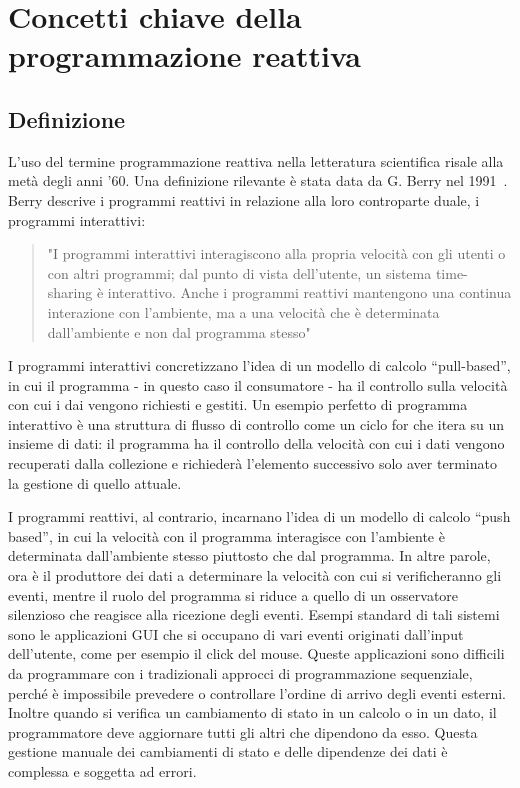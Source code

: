 \documentclass[12pt,a4paper,openright,twoside]{book}
\begin{document}
\section{Concetti chiave della programmazione reattiva}
\subsection{Definizione}
L'uso del termine programmazione reattiva nella letteratura scientifica risale alla metà degli anni '60. Una definizione rilevante è stata data da G. Berry nel 1991~\cite{DBLP:journals/pieee/BenvenisteB91}. Berry descrive i programmi reattivi in relazione alla loro controparte duale, i programmi interattivi: 
\begin{quotation}
    "I programmi interattivi interagiscono alla propria velocità con gli utenti o con altri programmi; dal punto di vista dell'utente, un sistema time-sharing è interattivo. Anche i programmi reattivi mantengono una continua interazione con l'ambiente, ma a una velocità che è determinata dall'ambiente e non dal programma stesso"
\end{quotation}

I programmi interattivi concretizzano l'idea di un modello di calcolo ``pull-based'', in cui il programma - in questo caso il consumatore - ha il controllo sulla velocità con cui i dai vengono richiesti e gestiti. 
Un esempio perfetto di programma interattivo è una struttura di flusso di controllo come un ciclo for che itera su un insieme di dati: il programma ha il controllo della velocità con cui i dati vengono recuperati dalla collezione e richiederà l'elemento successivo solo aver terminato la gestione di quello attuale. 

I programmi reattivi, al contrario, incarnano l'idea di un modello di calcolo ``push based'', in cui la velocità con il programma interagisce con l'ambiente è determinata dall'ambiente stesso piuttosto che dal programma. In altre parole, ora è il produttore dei dati a determinare la velocità con cui si verificheranno gli eventi, mentre il ruolo del programma si riduce a quello di un osservatore silenzioso che reagisce alla ricezione degli eventi. Esempi standard di tali sistemi sono le applicazioni GUI che si occupano di vari eventi originati dall'input dell'utente, come per esempio il click del mouse. Queste applicazioni sono difficili da programmare con i tradizionali approcci di programmazione sequenziale, perché è impossibile prevedere o controllare l'ordine di arrivo degli eventi esterni. Inoltre quando si verifica un cambiamento di stato in un calcolo o in un dato, il programmatore deve aggiornare tutti gli altri che dipendono da esso. Questa gestione manuale dei cambiamenti di stato e delle dipendenze dei dati è complessa e soggetta ad errori.
\end{document}
